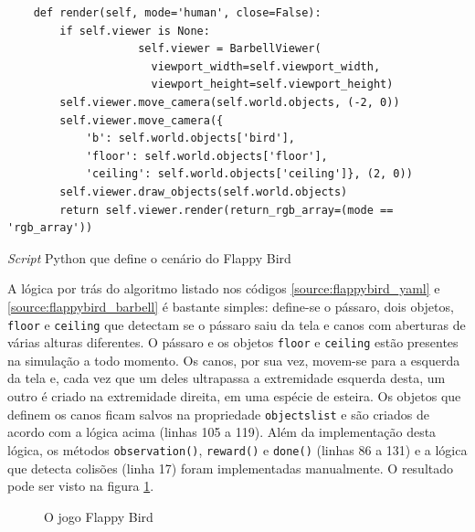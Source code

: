 \documentclass[cic,tc]{iiufrgs}
\newenvironment{longlisting}{\captionsetup{type=listing}}{}
\begin{document}
\begin{longlisting}
\begin{verbatim}
    def render(self, mode='human', close=False):
        if self.viewer is None:
                    self.viewer = BarbellViewer(
                      viewport_width=self.viewport_width,
                      viewport_height=self.viewport_height)
        self.viewer.move_camera(self.world.objects, (-2, 0))
        self.viewer.move_camera({
            'b': self.world.objects['bird'],
            'floor': self.world.objects['floor'],
            'ceiling': self.world.objects['ceiling']}, (2, 0))
        self.viewer.draw_objects(self.world.objects)
        return self.viewer.render(return_rgb_array=(mode == 'rgb_array'))

\end{verbatim}
\caption[Cópia de DNA]{\textit{Script} Python que define o cenário do Flappy Bird}
\label{source:flappybird_barbell}
\end{longlisting}


A lógica por trás do algoritmo listado nos códigos \ref{source:flappybird_yaml}
e \ref{source:flappybird_barbell} é bastante simples: define-se o pássaro, dois
objetos, \texttt{floor} e \texttt{ceiling} que detectam se o pássaro saiu da tela e
canos com aberturas de várias alturas diferentes. O pássaro e os objetos \texttt{floor}
e \texttt{ceiling} estão presentes na simulação a todo momento. Os canos, por sua
vez, movem-se para a esquerda da tela e, cada vez que um deles ultrapassa a
extremidade esquerda desta, um outro é criado na extremidade direita, em uma espécie de
esteira. Os objetos que definem os canos ficam salvos na propriedade \texttt{objectslist}
e são criados de acordo com a lógica acima (linhas 105 a 119). Além da implementação
desta lógica, os métodos \texttt{observation()}, \texttt{reward()} e \texttt{done()}
 (linhas 86 a 131) e a lógica que detecta colisões (linha 17) foram implementadas
 manualmente. O resultado pode ser visto na figura \ref{fig:flappybird_barbell}.

 \begin{figure}[h]
   \begin{center}
   \caption{O jogo Flappy Bird}
   \label{fig:flappybird_barbell}
 \end{center}
 \end{figure}
\end{document}
